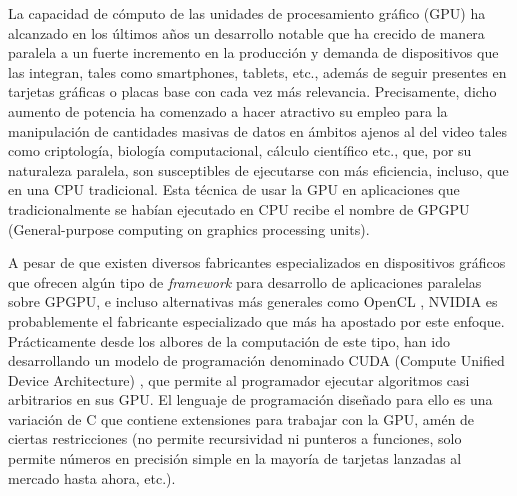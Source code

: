 \documentclass[twocolumn,twoside]{Jornadas}
\begin{document}
La capacidad de cómputo de las unidades de procesamiento gráfico (GPU) ha alcanzado en los últimos años un desarrollo notable que ha crecido de manera paralela a un fuerte incremento en la producción y demanda de dispositivos que las integran, tales como smartphones, tablets, etc., además de seguir presentes en tarjetas gráficas o placas base con cada vez más relevancia. Precisamente, dicho aumento de potencia ha comenzado a hacer atractivo su empleo para la manipulación de cantidades masivas de datos en ámbitos ajenos al del video tales como criptología, biología computacional, cálculo científico etc., que, por su naturaleza paralela, son susceptibles de ejecutarse con más eficiencia, incluso, que en una CPU tradicional. Esta técnica de usar la GPU en aplicaciones que tradicionalmente se habían ejecutado en CPU recibe el nombre de GPGPU (General-purpose computing on graphics processing units).

\vspace{5 mm}

A pesar de que existen diversos fabricantes especializados en dispositivos gráficos que ofrecen algún tipo de \emph{framework} para desarrollo de aplicaciones paralelas sobre GPGPU, e incluso alternativas más generales como OpenCL \cite{opencl}, NVIDIA es probablemente el fabricante especializado que más ha apostado por este enfoque. Prácticamente desde los albores de la computación de este tipo, han ido desarrollando un modelo de programación denominado CUDA (Compute Unified Device Architecture) \cite{aboutcuda}, que permite al programador ejecutar algoritmos casi arbitrarios en sus GPU. El lenguaje de programación diseñado para ello es una variación de C que contiene extensiones para trabajar con la GPU, amén de ciertas restricciones (no permite recursividad ni punteros a funciones, solo permite números en precisión simple en la mayoría de tarjetas lanzadas al mercado hasta ahora, etc.).

\vspace{5 mm}
\end{document}
